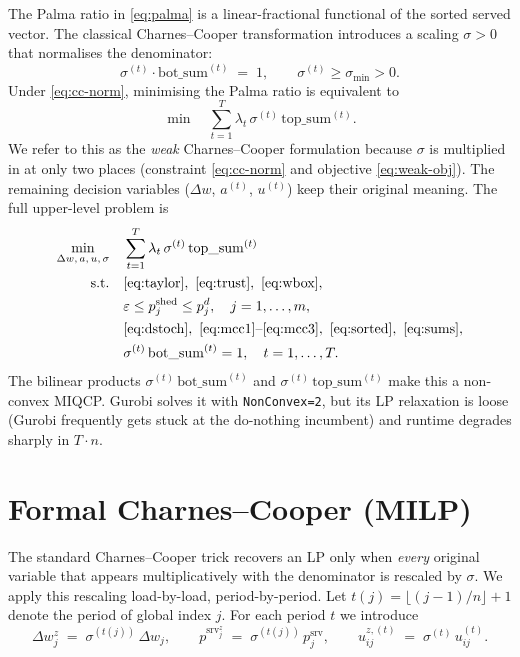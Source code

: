 \documentclass[11pt]{article}
\newcommand{\pshed}{p^{\mathrm{shed}}}
\newcommand{\pserved}{p^{\mathrm{srv}}}
\begin{document}
The Palma ratio in \eqref{eq:palma} is a linear-fractional functional of the
sorted served vector. The classical Charnes--Cooper transformation
\cite{CharnesCooper1962} introduces a scaling $\sigma > 0$ that normalises the
denominator:
\begin{equation}\label{eq:cc-norm}
    \sigma^{(t)} \cdot \mathrm{bot\_sum}^{(t)} \;=\; 1,
    \qquad \sigma^{(t)} \ge \sigma_{\min} > 0.
\end{equation}
Under \eqref{eq:cc-norm}, minimising the Palma ratio is equivalent to
\begin{equation}\label{eq:weak-obj}
    \min \quad \sum_{t=1}^{T} \lambda_{t}\,\sigma^{(t)}\,\mathrm{top\_sum}^{(t)}.
\end{equation}
We refer to this as the \emph{weak} Charnes--Cooper formulation because
$\sigma$ is multiplied in at only two places (constraint \eqref{eq:cc-norm} and
objective \eqref{eq:weak-obj}). The remaining decision variables ($\Delta w$,
$a^{(t)}$, $u^{(t)}$) keep their original meaning. The full upper-level problem
is
\begin{align}
    \min_{\Delta w,\,a,\,u,\,\sigma} \quad &
        \sum_{t=1}^{T} \lambda_{t}\,\sigma^{(t)}\,\mathrm{top\_sum}^{(t)}
        \label{eq:weak-full}\\
    \text{s.t.} \quad &
        \eqref{eq:taylor},\ \eqref{eq:trust},\ \eqref{eq:wbox},\nonumber\\
        & \varepsilon \le \pshed_{j} \le p^{d}_{j}, \quad j = 1,\dots,m,\nonumber\\
        & \eqref{eq:dstoch},\ \eqref{eq:mcc1}\text{--}\eqref{eq:mcc3},\ \eqref{eq:sorted},\ \eqref{eq:sums},\nonumber\\
        & \sigma^{(t)}\,\mathrm{bot\_sum}^{(t)} = 1, \quad t = 1,\dots,T.\nonumber
\end{align}
The bilinear products $\sigma^{(t)}\,\mathrm{bot\_sum}^{(t)}$ and
$\sigma^{(t)}\,\mathrm{top\_sum}^{(t)}$ make this a non-convex MIQCP. Gurobi
solves it with \texttt{NonConvex=2}, but its LP relaxation is loose (Gurobi
frequently gets stuck at the do-nothing incumbent) and runtime degrades sharply
in $T\cdot n$.

\section{Formal Charnes--Cooper (MILP)}\label{sec:formal}

The standard Charnes--Cooper trick recovers an LP only when \emph{every}
original variable that appears multiplicatively with the denominator is
rescaled by $\sigma$. We apply this rescaling load-by-load, period-by-period.
Let $t(j) = \lfloor (j-1)/n \rfloor + 1$ denote the period of global index $j$.
For each period $t$ we introduce
\begin{equation}\label{eq:rescale}
    \Delta w^{z}_{j} \;=\; \sigma^{(t(j))}\,\Delta w_{j},
    \qquad
    \pserved^{z}_{j} \;=\; \sigma^{(t(j))}\,\pserved_{j},
    \qquad
    u^{z,(t)}_{ij} \;=\; \sigma^{(t)}\,u^{(t)}_{ij}.
\end{equation}
\end{document}
